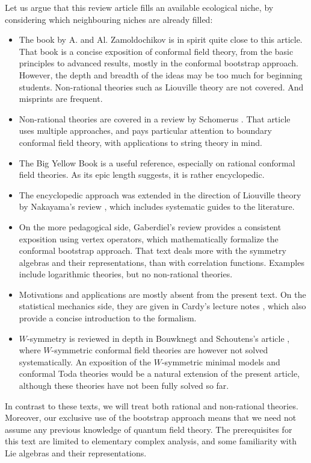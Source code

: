 \documentclass[12pt,a4paper,notitlepage]{report}
\numberwithin{equation}{section}
\theoremstyle{break}
\begin{document}
Let us argue that this review article fills an available ecological niche, by considering which neighbouring niches are already filled: 
\begin{itemize}
\item 
The book \cite{zz90} by A. and Al. Zamoldochikov is in spirit quite close to this article.
That book is a concise exposition of conformal field theory, from the basic principles to advanced results, mostly in the conformal bootstrap approach.
However, the depth and breadth of the ideas may be too much for beginning students.
Non-rational theories such as Liouville theory are not covered.
And misprints are frequent.
\item
Non-rational theories are covered in a review by Schomerus \cite{sch05}.
That article uses multiple approaches, and pays particular attention to boundary conformal field theory, with applications to string theory in mind. 
\item
The Big Yellow Book \cite{fms97} is a useful reference, especially on rational conformal field theories.
As its epic length suggests, it is rather encyclopedic. 
\item
The encyclopedic approach was extended in the direction of Liouville theory by Nakayama's review \cite{nak04}, which includes systematic guides to the literature.
\item 
On the more pedagogical side, Gaberdiel's review \cite{gab99} provides a consistent exposition using vertex operators, which mathematically formalize the conformal bootstrap approach.
That text deals more with the symmetry algebras and their representations, than with correlation functions.
Examples include logarithmic theories, but no non-rational theories.
\item
Motivations and applications are mostly absent from the present text.
On the statistical mechanics side, they are given in Cardy's lecture notes \cite{car08}, which also provide a concise introduction to the formalism.
\item 
$W$-symmetry is reviewed in depth in Bouwknegt and Schoutens's article \cite{bs92}, where $W$-symmetric conformal field theories are however not solved systematically.
An exposition of the $W$-symmetric minimal models and conformal Toda theories would be a natural extension of the present article, although these theories have not been fully solved so far. 
\end{itemize}
In contrast to these texts, we will treat both rational and non-rational theories.
Moreover, our exclusive use of the bootstrap approach means that we need not assume any previous knowledge of quantum field theory.
The prerequisites for this text are limited to 
elementary complex analysis, and some familiarity with Lie algebras and their representations.
\end{document}
